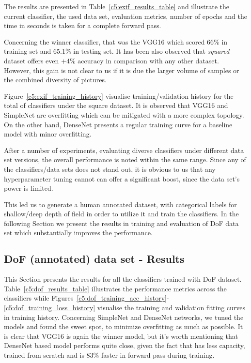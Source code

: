 The results are presented in Table~\ref{c5:exif_results_table} and illustrate the current classifier, the used data set, evaluation metrics, number of epochs and the time in seconds is taken for a complete forward pass.

Concerning the winner classifier, that was the VGG16 which scored 66\% in training set and 65.1\% in testing set. It has been also observed that \textit{squared} dataset offers even $+4\%$ accuracy in comparison with any other dataset. However, this gain is not clear to us if it is due the larger volume of samples or the combined diversity of pictures.

Figure~\ref{c5:exif_training_history} visualise training/validation history for the total of classifiers under the square dataset. It is observed that VGG16 and SimpleNet are overfitting which can be mitigated with a more complex topology. On the other hand, DenseNet presents a regular training curve for a baseline model with minor overfitting.

After a number of experiments, evaluating diverse classifiers under different data set versions, the overall performance is noted within the same range. Since any of the classifiers/data sets does not stand out, it is obvious to us that any hyperparameter tuning cannot can offer a significant boost, since the data set's power is limited.

This led us to generate a human annotated dataset, with categorical labels for shallow/deep depth of field in order to utilize it and train the classifiers.
In the following Section we present the results in training and evaluation of DoF data set which  substantially improves the performance.


\subsection{DoF (annotated) data set - Results}
\label{c5:dof_results}
This Section presents the results for all the classifiers trained with DoF dataset. Table~\ref{c5:dof_results_table} illustrates the performance metrics across the classifiers while Figures~\ref{c5:dof_training_acc_history}-\ref{c5:dof_training_loss_history} visualise the training and validation fitting curves in training history.
Concerning SimpleNet and DenseNet networks, we tuned the models and found the sweet spot, to minimize overfitting as much as possible.
It is clear that VGG16 is again the winner model, but it's worth mentioning that DenseNet based model performs quite close, given the fact that has less capacity, trained from scratch and is 83\% faster in forward pass during training.

